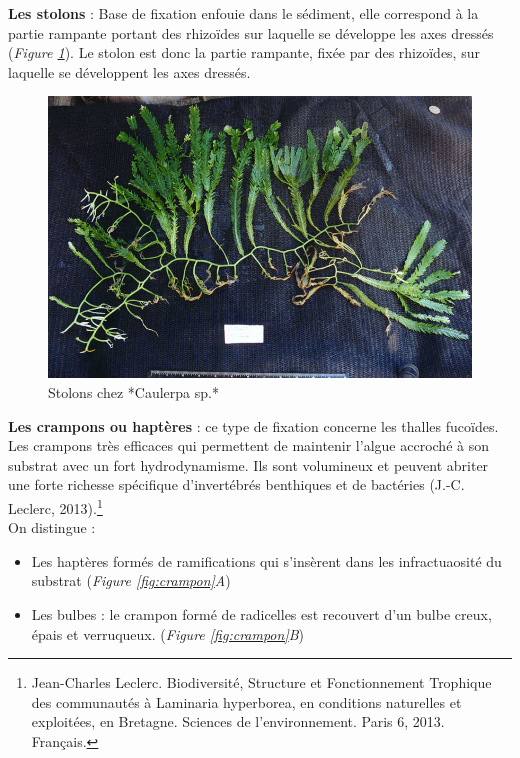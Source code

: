\documentclass[
]{book}
\begin{document}
\textbf{Les stolons} : Base de fixation enfouie dans le sédiment, elle correspond à la partie rampante portant des rhizoïdes sur laquelle se développe les axes dressés (\emph{Figure \ref{fig:stolon}}). Le stolon est donc la partie rampante, fixée par des rhizoïdes, sur laquelle se développent les axes dressés.

\begin{figure}[H]

{\centering \includegraphics[width=0.7\linewidth]{./images/caulerpa_stolon} 

}

\caption{Stolons chez *Caulerpa sp.*}\label{fig:stolon}
\end{figure}

\textbf{Les crampons ou haptères} : ce type de fixation concerne les thalles fucoïdes. Les crampons très efficaces qui permettent de maintenir l'algue accroché à son substrat avec un fort hydrodynamisme. Ils sont volumineux et peuvent abriter une forte richesse spécifique d'invertébrés benthiques et de bactéries (J.-C. Leclerc, 2013).\footnote{Jean-Charles Leclerc. Biodiversité, Structure et Fonctionnement Trophique des communautés à Laminaria hyperborea, en conditions naturelles et exploitées, en Bretagne. Sciences de l'environnement. Paris 6, 2013. Français.}\\
On distingue :

\begin{itemize}
\item
  Les haptères formés de ramifications qui s'insèrent dans les infractuaosité du substrat (\emph{Figure \ref{fig:crampon}A})
\item
  Les bulbes : le crampon formé de radicelles est recouvert d'un bulbe creux, épais et verruqueux. (\emph{Figure \ref{fig:crampon}B})
\end{itemize}
\end{document}

